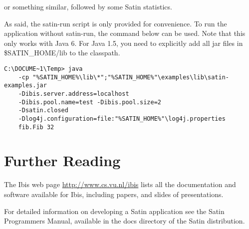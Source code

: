 \documentclass[a4paper,10pt]{article}
\begin{document}
or something similar, followed by some Satin statistics.

As said, the satin-run script is only provided for convenience. To run
the application without satin-run, the command below can be used.
Note that this only works with Java 6. For Java 1.5, you need to
explicitly add all jar files in \$SATIN\_HOME/lib to the classpath.

\noindent
{\small
\begin{verbatim}
C:\DOCUME~1\Temp> java
    -cp "%SATIN_HOME%\lib\*";"%SATIN_HOME%"\examples\lib\satin-examples.jar
    -Dibis.server.address=localhost
    -Dibis.pool.name=test -Dibis.pool.size=2
    -Dsatin.closed
    -Dlog4j.configuration=file:"%SATIN_HOME%"\log4j.properties
    fib.Fib 32
\end{verbatim}
}
\noindent

\section{Further Reading}

The Ibis web page \url{http://www.cs.vu.nl/ibis} lists all
the documentation and software available for Ibis, including papers, and
slides of presentations.

For detailed information on developing a Satin application see the
Satin Programmers Manual, available in the docs directory of the Satin
distribution.
\end{document}
